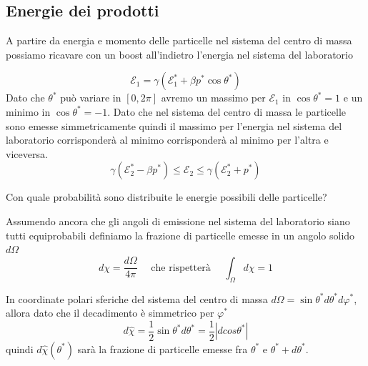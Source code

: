 \documentclass[12pt,a4paper,titlepage, twoside, openright]{book}
\numberwithin{equation}{chapter}
\begin{document}
%
%

\subsection{Energie dei prodotti}
A partire da energia e momento delle particelle nel sistema del centro di massa possiamo ricavare con un boost all'indietro l'energia nel sistema del laboratorio

\[
\mathcal{E}_1=\gamma(\mathcal{E}_1^*+\beta p^*\cos{\theta^*})
\]
Dato che $\theta^*$ può variare in $[0,2\pi]$ avremo un massimo per $\mathcal{E}_1$ in $\cos{\theta^*}=1$ e un minimo in $\cos{\theta^*}=-1$. Dato che nel sistema del centro di massa le particelle sono emesse simmetricamente quindi il massimo per l'energia nel sistema del laboratorio corrisponderà al minimo corrisponderà al minimo per l'altra e viceversa.
\[
\gamma(\mathcal{E}_2^*-\beta p^*)\leq \mathcal{E}_2 \leq \gamma (\mathcal{E}_2^* + p^* )
\]

Con quale probabilità sono distribuite le energie possibili delle particelle?

Assumendo ancora che gli angoli di emissione nel sistema del laboratorio siano tutti equiprobabili definiamo la frazione di particelle emesse in un angolo solido $d\Omega$ 
\[
d\chi =\dfrac{d\Omega}{4\pi} \quad \text{ che rispetterà } \quad \int_{\Omega}d\chi=1
\]

In coordinate polari sferiche del sistema del centro di massa $d\Omega=\sin{\theta^*}d\theta^*d\varphi^*$, allora dato che il decadimento è simmetrico per $\varphi^*$
\[
d\hat{\chi}=\dfrac{1}{2}\sin{\theta^*}d\theta^*=\dfrac{1}{2}\left| d cos{\theta^*} \right|
\]
quindi $d\hat{\chi}(\theta^*)$ sarà la frazione di particelle emesse fra $\theta^*$ e $\theta^*+d\theta^*$.
\end{document}
